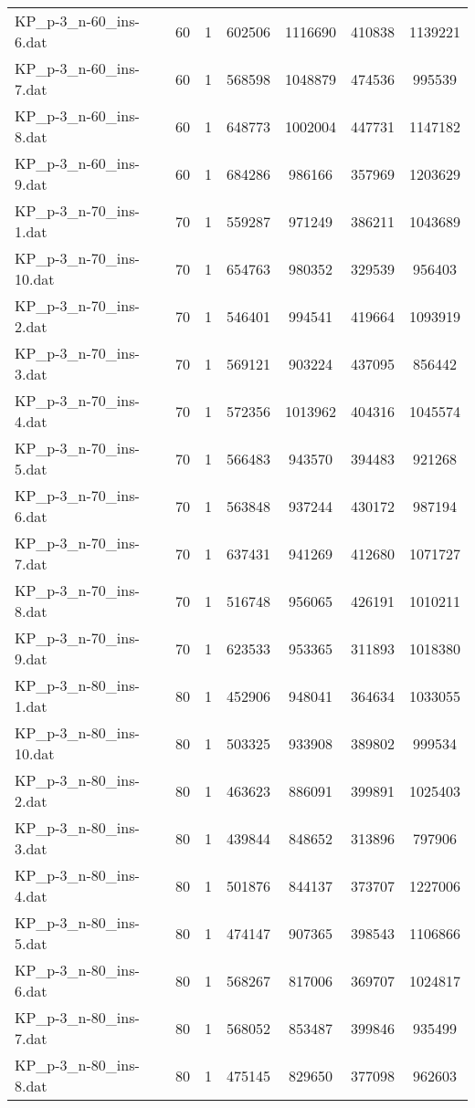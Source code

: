 \begin{table}[!ht]
\begin{tabular}{lcccccc}
KP\_p-3\_n-60\_ins-6.dat & 60 & 1 & 602506 & 1116690 & 410838 & 1139221 \\
KP\_p-3\_n-60\_ins-7.dat & 60 & 1 & 568598 & 1048879 & 474536 & 995539 \\
KP\_p-3\_n-60\_ins-8.dat & 60 & 1 & 648773 & 1002004 & 447731 & 1147182 \\
KP\_p-3\_n-60\_ins-9.dat & 60 & 1 & 684286 & 986166 & 357969 & 1203629 \\
KP\_p-3\_n-70\_ins-1.dat & 70 & 1 & 559287 & 971249 & 386211 & 1043689 \\
KP\_p-3\_n-70\_ins-10.dat & 70 & 1 & 654763 & 980352 & 329539 & 956403 \\
KP\_p-3\_n-70\_ins-2.dat & 70 & 1 & 546401 & 994541 & 419664 & 1093919 \\
KP\_p-3\_n-70\_ins-3.dat & 70 & 1 & 569121 & 903224 & 437095 & 856442 \\
KP\_p-3\_n-70\_ins-4.dat & 70 & 1 & 572356 & 1013962 & 404316 & 1045574 \\
KP\_p-3\_n-70\_ins-5.dat & 70 & 1 & 566483 & 943570 & 394483 & 921268 \\
KP\_p-3\_n-70\_ins-6.dat & 70 & 1 & 563848 & 937244 & 430172 & 987194 \\
KP\_p-3\_n-70\_ins-7.dat & 70 & 1 & 637431 & 941269 & 412680 & 1071727 \\
KP\_p-3\_n-70\_ins-8.dat & 70 & 1 & 516748 & 956065 & 426191 & 1010211 \\
KP\_p-3\_n-70\_ins-9.dat & 70 & 1 & 623533 & 953365 & 311893 & 1018380 \\
KP\_p-3\_n-80\_ins-1.dat & 80 & 1 & 452906 & 948041 & 364634 & 1033055 \\
KP\_p-3\_n-80\_ins-10.dat & 80 & 1 & 503325 & 933908 & 389802 & 999534 \\
KP\_p-3\_n-80\_ins-2.dat & 80 & 1 & 463623 & 886091 & 399891 & 1025403 \\
KP\_p-3\_n-80\_ins-3.dat & 80 & 1 & 439844 & 848652 & 313896 & 797906 \\
KP\_p-3\_n-80\_ins-4.dat & 80 & 1 & 501876 & 844137 & 373707 & 1227006 \\
KP\_p-3\_n-80\_ins-5.dat & 80 & 1 & 474147 & 907365 & 398543 & 1106866 \\
KP\_p-3\_n-80\_ins-6.dat & 80 & 1 & 568267 & 817006 & 369707 & 1024817 \\
KP\_p-3\_n-80\_ins-7.dat & 80 & 1 & 568052 & 853487 & 399846 & 935499 \\
KP\_p-3\_n-80\_ins-8.dat & 80 & 1 & 475145 & 829650 & 377098 & 962603 \\

\end{tabular}
\end{table}
